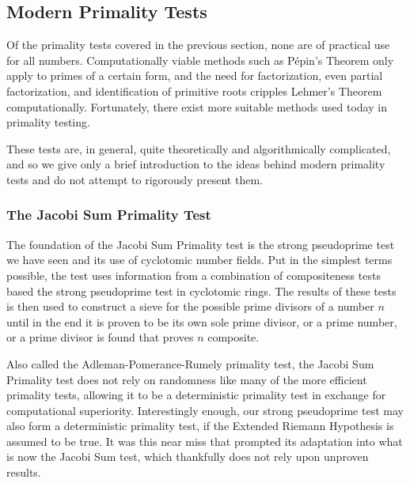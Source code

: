 \documentclass{article}
\begin{document}

\subsection*{Modern Primality Tests}

\par Of the primality tests covered in the previous section, none are of practical use for all numbers. Computationally viable methods such as P\'{e}pin's Theorem only apply to primes of a certain form, and the need for factorization, even partial factorization, and identification of primitive roots cripples Lehmer's Theorem computationally. Fortunately, there exist more suitable methods used today in primality testing. 
\par These tests are, in general, quite theoretically and algorithmically complicated, and so we give only a brief introduction to the ideas behind modern primality tests and do not attempt to rigorously present them.

\subsubsection*{The Jacobi Sum Primality Test}

\par The foundation of the Jacobi Sum Primality test is the strong pseudoprime test we have seen and its use of cyclotomic number fields. Put in the simplest terms possible, the test uses information from a combination of compositeness tests based the strong pseudoprime test in cyclotomic rings. The results of these tests is then used to construct a sieve for the possible prime divisors of a number $n$ until in the end it is proven to be its own sole prime divisor, or a prime number, or a prime divisor is found that proves $n$ composite.

 \par Also called the Adleman-Pomerance-Rumely primality test,  the Jacobi Sum Primality test does not rely on randomness  like many of the more efficient primality tests, allowing it to be a deterministic primality test in exchange for computational superiority. Interestingly enough, our strong pseudoprime test may also form a deterministic primality test, if the Extended Riemann Hypothesis is assumed to be true. It was this near miss that prompted its adaptation into what is now the Jacobi Sum test, which thankfully does not rely upon unproven results.
\end{document}
